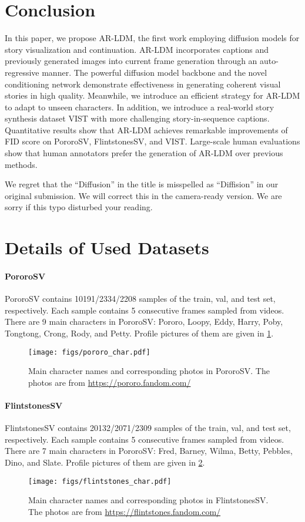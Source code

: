 \documentclass[10pt,twocolumn,letterpaper]{article}
\begin{document}
\section{Conclusion}
In this paper, we propose AR-LDM, the first work employing diffusion models for story visualization and continuation. AR-LDM incorporates captions and previously generated images into current frame generation through an auto-regressive manner. The powerful diffusion model backbone and the novel conditioning network demonstrate effectiveness in generating coherent visual stories in high quality. Meanwhile, we introduce an efficient strategy for AR-LDM to adapt to unseen characters. In addition, we introduce a real-world story synthesis dataset VIST with more challenging story-in-sequence captions. Quantitative results show that AR-LDM achieves remarkable improvements of FID score on PororoSV, FlintstonesSV, and VIST. Large-scale human evaluations show that human annotators prefer the generation of AR-LDM over previous methods. 
\clearpage
{\small


}
\clearpage
\appendix
We regret that the ``Diffusion'' in the title is misspelled as ``Diffision'' in our original submission. We will correct this in the camera-ready version. We are sorry if this typo disturbed your reading.
\section{Details of Used Datasets}
\label{sec:detail_of_used_datasets}
\paragraph{PororoSV}
PororoSV contains 10191/2334/2208 samples of the train, val, and test set, respectively. Each sample contains 5 consecutive frames sampled from videos. There are 9 main characters in PororoSV: Pororo, Loopy, Eddy, Harry, Poby, Tongtong, Crong, Rody, and Petty. Profile pictures of them are given in \cref{fig:pororosv_char}.
\begin{figure}[h]
    \centering
    \texttt{[image: figs/pororo\_char.pdf]}
    \caption{Main character names and corresponding photos in PororoSV. The photos are from \url{https://pororo.fandom.com/}}
    \label{fig:pororosv_char}
\end{figure}
\paragraph{FlintstonesSV}
FlintstonesSV contains 20132/2071/2309 samples of the train, val, and test set, respectively. Each sample contains 5 consecutive frames sampled from videos. There are 7 main characters in PororoSV: Fred, Barney, Wilma, Betty, Pebbles, Dino, and Slate. Profile pictures of them are given in \cref{fig:flintstonesv_char}.
\begin{figure}[h]
    \centering
    \texttt{[image: figs/flintstones\_char.pdf]}
    \caption{Main character names and corresponding photos in FlintstonesSV. The photos are from \url{https://flintstones.fandom.com/}}
    \label{fig:flintstonesv_char}
\end{figure}
\newpage
\end{document}
